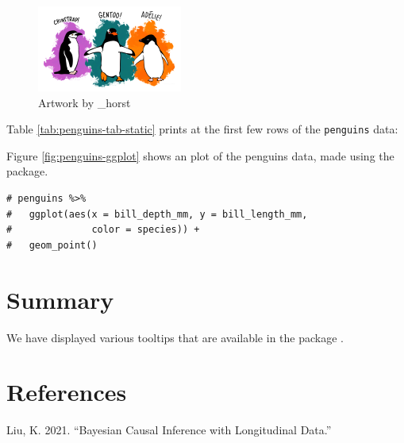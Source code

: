 \begin{figure}
\includegraphics[width=1\linewidth,height=0.3\textheight]{figures/penguins} \caption{Artwork by \@allison\_horst}\label{fig:penguins-alison}
\end{figure}

Table \ref{tab:penguins-tab-static} prints at the first few rows of the \texttt{penguins} data:

Figure \ref{fig:penguins-ggplot} shows an plot of the penguins data, made using the  package.

\begin{verbatim}
# penguins %>% 
#   ggplot(aes(x = bill_depth_mm, y = bill_length_mm, 
#              color = species)) + 
#   geom_point()
\end{verbatim}

\section{Summary}\label{summary}

We have displayed various tooltips that are available in the package .

\section*{References}\label{references}

\label{refs}
\begin{CSLReferences}{1}{0}
Liu, K. 2021. {``Bayesian Causal Inference with Longitudinal Data.''}

\end{CSLReferences}


